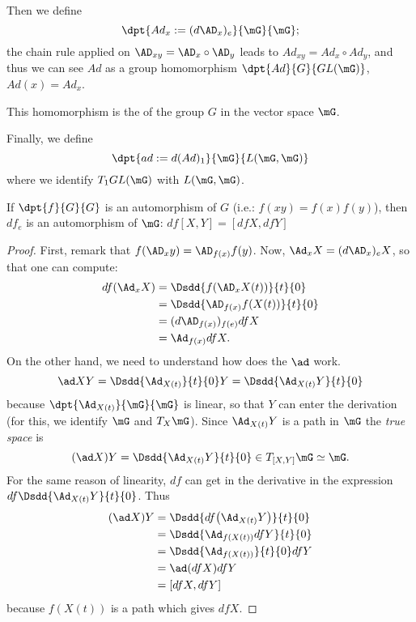 Then we define
\[
	\dpt{Ad_x:=(d\AD_x)_e}{\mG}{\mG};
\]
the chain rule applied on $\AD_{xy}=\AD_x\circ\AD_y$ leads to $Ad_{xy}=Ad_x\circ Ad_y$, and thus we can see $Ad$ as a group homomorphism $\dpt{Ad}{G}{GL(\mG)}$, $Ad(x)=Ad_x$.

\begin{definition}
	This homomorphism is the  of the group $G$ in the vector space $\mG$.
\end{definition}


Finally, we define
\[
	\dpt{ad:=d(Ad)_1}{\mG}{L(\mG,\mG)}
\]
where we identify $T_1GL(\mG)$ with $L(\mG,\mG)$.

\begin{lemma}\label{LEMooEALFooJOeOgk}
	If $\dpt{f}{G}{G}$ is an automorphism of $G$ (i.e.: $f(xy)=f(x)f(y)$), then $df_e$ is an automorphism of $\mG$: $df[X,Y]=[df X,dfY]$
\end{lemma}

\begin{proof}
	First, remark that $f(\AD_xy)=\AD_{f(x)}f(y)$. Now, $\Ad_x X=(d\AD_x)_eX$, so that one can compute:
	\begin{equation}
		\begin{split}
			df(\Ad_xX)&=\Dsdd{f(\AD_xX(t))}{t}{0}\\
			&=\Dsdd{   \AD_{f(x)}f(X(t))  }{t}{0}\\
			&=(d\AD_{f(x)})_{f(e)}df X\\
			&=\Ad_{f(x)}df X.
		\end{split}
	\end{equation}
	On the other hand, we need to understand how does the $\ad$ work.
	\[
		\ad XY=\Dsdd{\Ad_{X(t)}}{t}{0}Y=\Dsdd{\Ad_{X(t)}Y}{t}{0}
	\]
	because $\dpt{\Ad_{X(t)}}{\mG}{\mG}$ is linear, so that $Y$ can enter the derivation (for this, we identify $\mG$ and $T_X\mG$). Since $\Ad_{X(t)}Y$ is a path in $\mG$ the \emph{true space} is
	\[
		(\ad X)Y=\Dsdd{ \Ad_{X(t)}Y }{t}{0}\in T_{[X,Y]}\mG\simeq\mG.
	\]
	For the same reason of linearity, $df$ can get in the derivative in the expression $df\Dsdd{  \Ad_{X(t)}Y  }{t}{0}$. Thus
	\begin{equation}
		\begin{split}
			(\ad X)Y&=\Dsdd{  df\big(\Ad_{X(t)}Y\big)  }{t}{0}\\
			&=\Dsdd{  \Ad_{ f(X(t)) }df Y  }{t}{0}\\
			&=\Dsdd{ \Ad_{f(X(t))} }{t}{0}df Y\\
			&=\ad(dfX)df Y\\
			&=[dfX,df Y]
		\end{split}
	\end{equation}
	because $f(X(t))$ is a path which gives $df X$.
\end{proof}

